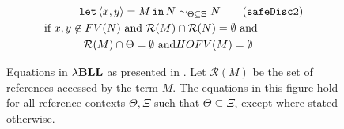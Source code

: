 \begin{figure}[htpb]
\begin{align}
    \letin{\lis{x,y}=M}{N}&\sim_{\Theta\subseteq\Xi}N \tag{$\mathtt{safeDisc2}$}\label{safeDisc2} \\
    \text{if}\ x,y \not\in FV(N) \ \text{and}\ \mathcal{R}(M) &\cap \mathcal{R}(N) = \emptyset \ \text{and}\ \nonumber \\ \mathcal{R}(M) \cap \Theta = \emptyset \ \text{and} &HOFV(M) = \emptyset \nonumber 
    \end{align}
    \caption{Equations in ${\lambda}\mathbf{BLL}$ as presented in \cite{lago2024-extended}. Let $\mathcal{R}(M)$ be the set of references accessed by the term $M$. The equations in this figure hold for all reference contexts $\Theta, \Xi$ such that $\Theta \subseteq \Xi$, except where stated otherwise.}
    \label{fig:equations}
\end{figure}
